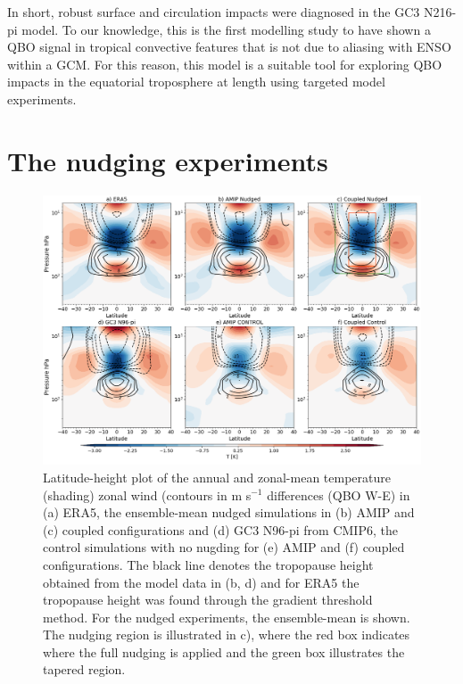 In short, robust surface and circulation impacts were diagnosed in the GC3 N216-pi model. 
To our knowledge, this is the first modelling study to have shown a QBO signal in tropical convective features that is not due to aliasing with ENSO within a GCM.
For this reason, this model is a suitable tool for exploring QBO impacts in the equatorial troposphere at length using targeted model experiments. 

\section{The nudging experiments}\label{sq:nudging}

\begin{figure}[t!]
\centering
 \includegraphics[width=\linewidth]{figures/zonal_thesis.png}
\caption[Zonal-mean zonal wind QBO difference]{Latitude-height plot of the annual and zonal-mean temperature (shading) zonal wind (contours in m s$^{-1}$ differences (QBO W-E) in (a) ERA5, the ensemble-mean nudged simulations in (b) AMIP and (c) coupled configurations and (d) GC3 N96-pi from CMIP6, the control simulations with no nugding for (e) AMIP and (f) coupled configurations. The black line denotes the tropopause height obtained from the model data in (b, d) and for ERA5 the tropopause height was found through the gradient threshold method. For the nudged experiments, the ensemble-mean is shown. The nudging region is illustrated in c), where the red box indicates where the full nudging is applied and the green box illustrates the tapered region. }
\label{fig:zonal_u}
\end{figure}

